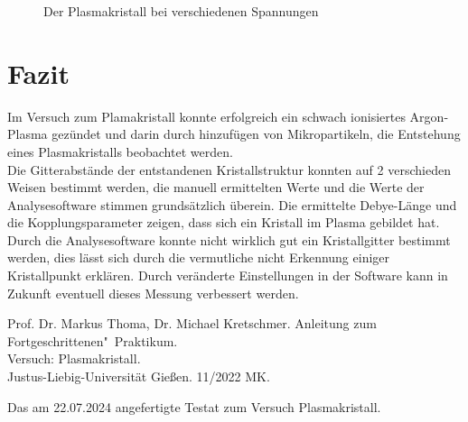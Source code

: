 \documentclass[12pt,a4paper,ngerman]{article}
\begin{document}
\begin{figure}
		\caption{Der Plasmakristall bei verschiedenen Spannungen}
		\label{fig:Druckabnahme}
	\end{figure}

\section{Fazit}
	Im Versuch zum Plamakristall konnte erfolgreich ein schwach ionisiertes Argon-Plasma gezündet und darin durch hinzufügen von Mikropartikeln, die Entstehung eines Plasmakristalls beobachtet werden.\\
	Die Gitterabstände der entstandenen Kristallstruktur konnten auf 2 verschieden Weisen bestimmt werden, die manuell ermittelten Werte und die Werte der Analysesoftware stimmen grundsätzlich überein. Die ermittelte Debye-Länge und die Kopplungsparameter zeigen, dass sich ein Kristall im Plasma gebildet hat.\\
	Durch die Analysesoftware konnte nicht wirklich gut ein Kristallgitter bestimmt werden, dies lässt sich durch die vermutliche nicht Erkennung einiger Kristallpunkt erklären. Durch veränderte Einstellungen in der Software kann in Zukunft eventuell dieses Messung verbessert werden.

\newpage
 \begin{thebibliography}{111}%
	Prof. Dr. Markus Thoma, Dr. Michael Kretschmer. Anleitung zum Fortgeschrittenen"~Praktikum.\\ \glqq Versuch: Plasmakristall\grqq.\\ Justus-Liebig-Universität Gießen. 11/2022 MK.
	
 		Das am 22.07.2024 angefertigte Testat zum Versuch \glqq Plasmakristall\grqq.
 	\end{thebibliography}
\end{document}
